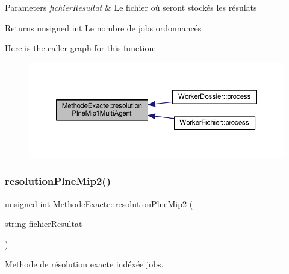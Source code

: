 \begin{DoxyParams}{Parameters}
{\em fichier\+Resultat} & Le fichier où seront stockés les résulats \\
\hline
\end{DoxyParams}
\begin{DoxyReturn}{Returns}
unsigned int Le nombre de jobs ordonnancés 
\end{DoxyReturn}
Here is the caller graph for this function\+:\nopagebreak
\begin{figure}[H]
\begin{center}
\leavevmode
\includegraphics[width=350pt]{classMethodeExacte_a3b3d9ad4a6d21f6e3be43212eb706054_icgraph}
\end{center}
\end{figure}
\mbox{\label{classMethodeExacte_a3163e487cc9e99ee7667d1dd146edb4b}} 
\subsubsection{\texorpdfstring{resolution\+Plne\+Mip2()}{resolutionPlneMip2()}}
{\footnotesize\ttfamily unsigned int Methode\+Exacte\+::resolution\+Plne\+Mip2 (\begin{DoxyParamCaption}\item[{string}]{fichier\+Resultat }\end{DoxyParamCaption})}



Methode de résolution exacte indéxée jobs. 


